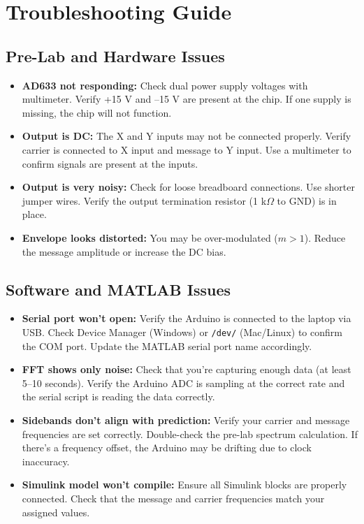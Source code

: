 \documentclass[11pt,letterpaper]{article}
\begin{document}
\section{Troubleshooting Guide}

\subsection{Pre-Lab and Hardware Issues}

\begin{itemize}
    \item \textbf{AD633 not responding:} Check dual power supply voltages with multimeter. Verify +15 V and --15 V are present at the chip. If one supply is missing, the chip will not function.
    \item \textbf{Output is DC:} The X and Y inputs may not be connected properly. Verify carrier is connected to X input and message to Y input. Use a multimeter to confirm signals are present at the inputs.
    \item \textbf{Output is very noisy:} Check for loose breadboard connections. Use shorter jumper wires. Verify the output termination resistor (1 k$\Omega$ to GND) is in place.
    \item \textbf{Envelope looks distorted:} You may be over-modulated ($m > 1$). Reduce the message amplitude or increase the DC bias.
\end{itemize}

\subsection{Software and MATLAB Issues}

\begin{itemize}
    \item \textbf{Serial port won't open:} Verify the Arduino is connected to the laptop via USB. Check Device Manager (Windows) or \texttt{/dev/} (Mac/Linux) to confirm the COM port. Update the MATLAB serial port name accordingly.
    \item \textbf{FFT shows only noise:} Check that you're capturing enough data (at least 5--10 seconds). Verify the Arduino ADC is sampling at the correct rate and the serial script is reading the data correctly.
    \item \textbf{Sidebands don't align with prediction:} Verify your carrier and message frequencies are set correctly. Double-check the pre-lab spectrum calculation. If there's a frequency offset, the Arduino may be drifting due to clock inaccuracy.
    \item \textbf{Simulink model won't compile:} Ensure all Simulink blocks are properly connected. Check that the message and carrier frequencies match your assigned values.
\end{itemize}
\end{document}
